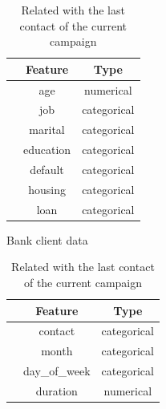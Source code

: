 \documentclass[11pt,a4paper]{article}
\newcounter{magicrownumbers}
\newcommand\rownumber{\stepcounter{magicrownumbers}\arabic{magicrownumbers}}
\begin{document}
    \begin{table}[h]
        \begin{minipage}{.5\linewidth}
            \centering
            \begin{tabular}{r c c}
                 & Feature & Type \\
                \hline \hline
                \rownumber & age & numerical \\
                \rownumber & job & categorical \\
                \rownumber & marital & categorical \\
                \rownumber & education & categorical \\
                \rownumber & default & categorical \\
                \rownumber & housing & categorical \\
                \rownumber & loan & categorical \\
            \end{tabular}
            \caption{Bank client data}\label{tab:bank.client}
        \end{minipage}%
        \begin{minipage}{.5\linewidth}
            \centering
            \begin{tabular}{r c c}
                 & Feature & Type \\
                \hline \hline
                \rownumber & contact & categorical \\
                \rownumber & month & categorical \\
                \rownumber & day\_of\_week & categorical \\
                \rownumber & duration & numerical \\
            \end{tabular}
            \caption{Related with the last contact of the current campaign}\label{tab:last.contact}
        \end{minipage}
    \end{table}
    
\end{document}
